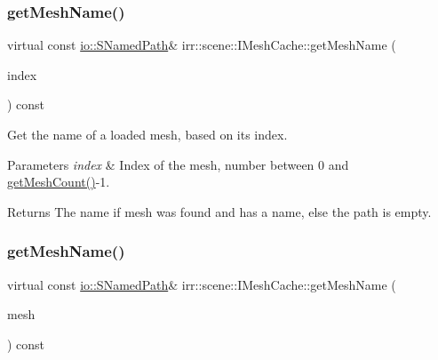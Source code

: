 \subsubsection{\texorpdfstring{get\+Mesh\+Name()}{getMeshName()}\hspace{0.1cm}{\footnotesize\ttfamily [1/2]}}
{\footnotesize\ttfamily virtual const \hyperlink{structirr_1_1io_1_1SNamedPath}{io\+::\+S\+Named\+Path}\& irr\+::scene\+::\+I\+Mesh\+Cache\+::get\+Mesh\+Name (\begin{DoxyParamCaption}\item[{\hyperlink{namespaceirr_a0416a53257075833e7002efd0a18e804}{u32}}]{index }\end{DoxyParamCaption}) const\hspace{0.3cm}{\ttfamily [pure virtual]}}



Get the name of a loaded mesh, based on its index. 


\begin{DoxyParams}{Parameters}
{\em index} & Index of the mesh, number between 0 and \hyperlink{classirr_1_1scene_1_1IMeshCache_a9dc99e46309a6ef494ef7672c9b49853}{get\+Mesh\+Count()}-\/1. \\
\hline
\end{DoxyParams}
\begin{DoxyReturn}{Returns}
The name if mesh was found and has a name, else the path is empty. 
\end{DoxyReturn}
\mbox{\label{classirr_1_1scene_1_1IMeshCache_a7271fa1247b8c1198c196dc947b5ede0}} 
\subsubsection{\texorpdfstring{get\+Mesh\+Name()}{getMeshName()}\hspace{0.1cm}{\footnotesize\ttfamily [2/2]}}
{\footnotesize\ttfamily virtual const \hyperlink{structirr_1_1io_1_1SNamedPath}{io\+::\+S\+Named\+Path}\& irr\+::scene\+::\+I\+Mesh\+Cache\+::get\+Mesh\+Name (\begin{DoxyParamCaption}\item[{const \hyperlink{classirr_1_1scene_1_1IMesh}{I\+Mesh} $\ast$const}]{mesh }\end{DoxyParamCaption}) const\hspace{0.3cm}{\ttfamily [pure virtual]}}



